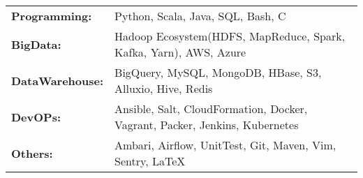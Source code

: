 \begin{flushleft}
\begin{tabular}{@{} l p{20cm}}
  \textbf{Programming:} & Python, Scala, Java, SQL, Bash, C\\
  \textbf{BigData:} & Hadoop Ecosystem(HDFS, MapReduce, Spark, Kafka, Yarn), AWS, Azure\\
  \textbf{DataWarehouse:} & BigQuery, MySQL, MongoDB, HBase, S3, Alluxio, Hive, Redis\\
  \textbf{DevOPs:} & Ansible, Salt, CloudFormation, Docker, Vagrant, Packer, Jenkins, Kubernetes\\
  \textbf{Others:} & Ambari, Airflow, UnitTest, Git, Maven, Vim, Sentry, \LaTeX
\end{tabular}
\end{flushleft}


%
%
%
%
%
%
